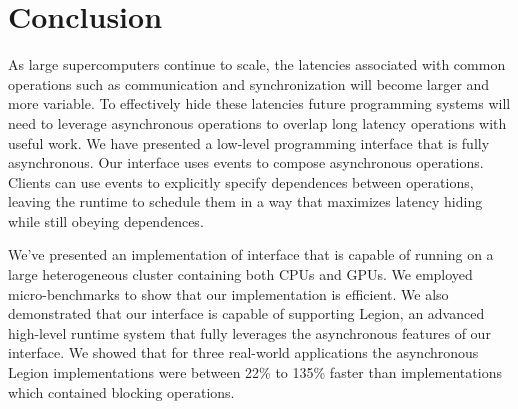 
\section{Conclusion}
\label{sec:conclusion}

As large supercomputers continue to scale, the latencies associated
with common operations such as communication and synchronization will
become larger and more variable.  To effectively hide these latencies
future programming systems will need to leverage asynchronous operations
to overlap long latency operations with useful work.  We have
presented a low-level programming interface that is fully asynchronous.
Our interface uses events to compose asynchronous operations.  Clients
can use events to explicitly specify dependences between operations,
leaving the runtime to schedule them in a way that maximizes latency 
hiding while still obeying dependences.

We've presented an implementation of interface that is capable of running
on a large heterogeneous cluster containing both CPUs and GPUs.  We
employed micro-benchmarks to show that our implementation is efficient.
We also demonstrated that our interface is capable of supporting Legion,
an advanced high-level runtime system that fully leverages the asynchronous
features of our interface.  We showed that for three real-world applications
the asynchronous Legion implementations were between 22\% to 135\% faster than
implementations which contained blocking operations.


